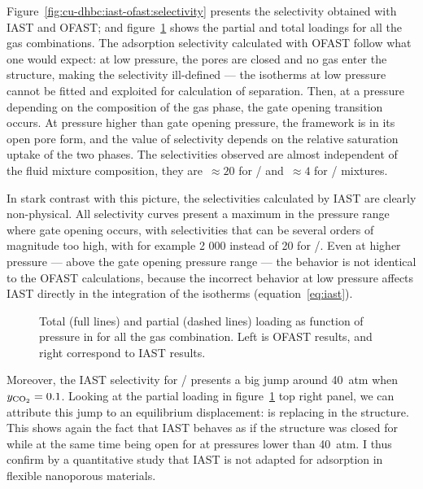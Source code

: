\documentclass[thesis]{subfiles}
\begin{document}
Figure~\ref{fig:cu-dhbc:iast-ofast:selectivity} presents the selectivity
obtained with IAST and OFAST; and figure~\ref{fig:cu-dhbc:iast-ofast:loadings}
shows the partial and total loadings for all the gas combinations. The
adsorption selectivity calculated with OFAST follow what one would expect: at
low pressure, the pores are closed and no gas enter the structure, making the
selectivity ill-defined --- the isotherms at low pressure cannot be fitted and
exploited for calculation of separation.  Then, at a pressure depending on the
composition of the gas phase, the gate opening transition occurs. At pressure
higher than gate opening pressure, the framework is in its open pore form, and
the value of selectivity depends on the relative saturation uptake of the two
phases. The selectivities observed are almost independent of the fluid mixture
composition, they are~$\approx 20$ for / and~$\approx 4$ for
/ mixtures.

In stark contrast with this picture, the selectivities calculated by IAST are
clearly non-physical. All selectivity curves present a maximum in the pressure
range where gate opening occurs, with selectivities that can be several orders
of magnitude too high, with for example 2 000 instead of 20 for
/. Even at higher pressure --- above the gate opening pressure
range --- the behavior is not identical to the OFAST calculations, because the
incorrect behavior at low pressure affects IAST directly in the integration of
the isotherms (equation~\eqref{eq:iast}).

\begin{figure}[htp]
    \centering
    
    \caption{Total (full lines) and partial (dashed lines) loading as function
    of pressure in \Cudhbc for all the gas combination. Left is OFAST results,
    and right correspond to IAST results.}
    \label{fig:cu-dhbc:iast-ofast:loadings}
\end{figure}

Moreover, the IAST selectivity for / presents a big jump around
\SI{40}{atm} when $y_{\ce{CO2}} = 0.1$. Looking at the partial loading in
figure~\ref{fig:cu-dhbc:iast-ofast:loadings} top right panel, we can attribute
this jump to an equilibrium displacement:  is replacing  in the
structure. This shows again the fact that IAST behaves as if the structure was
closed for  while at the same time being open for  at pressures
lower than \SI{40}{atm}. I thus confirm by a quantitative study that IAST is not
adapted for adsorption in flexible nanoporous materials.
\end{document}
